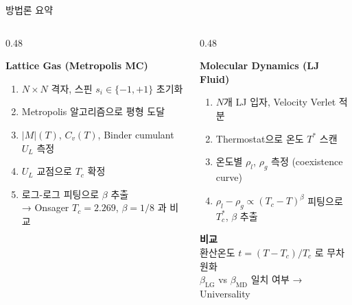 \documentclass[aspectratio=169]{beamer}
\begin{document}
\begin{frame}{방법론 요약}

\begin{columns}[T]
\begin{column}{0.48\textwidth}

\textbf{Lattice Gas (Metropolis MC)}\\[0.5em]
\begin{enumerate}\itemsep0.3em
  \item $N\times N$ 격자, 스핀 $s_i \in \{-1,+1\}$ 초기화
  \item Metropolis 알고리즘으로 평형 도달
  \item $|M|(T)$, $C_v(T)$, Binder cumulant $U_L$ 측정
  \item $U_L$ 교점으로 $T_c$ 확정
  \item 로그-로그 피팅으로 $\beta$ 추출\\
        → Onsager $T_c = 2.269$, $\beta = 1/8$ 과 비교
\end{enumerate}

\end{column}
\begin{column}{0.48\textwidth}

\textbf{Molecular Dynamics (LJ Fluid)}\\[0.5em]
\begin{enumerate}\itemsep0.3em
  \item $N$개 LJ 입자, Velocity Verlet 적분
  \item Thermostat으로 온도 $T^*$ 스캔
  \item 온도별 $\rho_l$, $\rho_g$ 측정 (coexistence curve)
  \item $\rho_l - \rho_g \propto (T_c - T)^\beta$ 피팅으로\\
        $T_c^*$, $\beta$ 추출
\end{enumerate}

\vspace{0.8em}
\textbf{비교}\\[0.4em]
환산온도 $t = (T-T_c)/T_c$ 로 무차원화\\[0.3em]
\alert{$\beta_\text{LG}$ vs $\beta_\text{MD}$ 일치 여부 → Universality}

\end{column}
\end{columns}

\end{frame}
\end{document}
